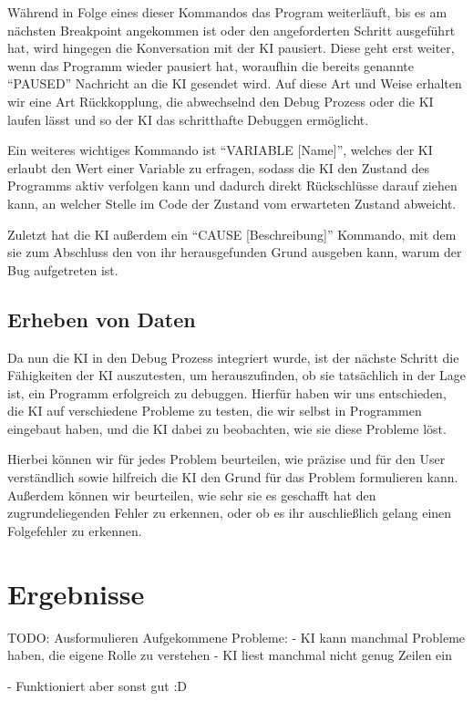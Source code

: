 \documentclass[a4paper,12pt,ngerman]{scrartcl}
\begin{document}
Während in Folge eines dieser Kommandos das Program weiterläuft, bis es am nächsten Breakpoint angekommen ist oder den angeforderten Schritt ausgeführt hat, wird hingegen die Konversation mit der KI pausiert. Diese geht erst weiter, wenn das Programm wieder pausiert hat, woraufhin die bereits genannte ``PAUSED'' Nachricht an die KI gesendet wird. Auf diese Art und Weise erhalten wir eine Art Rückkopplung, die abwechselnd den Debug Prozess oder die KI laufen lässt und so der KI das schritthafte Debuggen ermöglicht.

Ein weiteres wichtiges Kommando ist ``VARIABLE [Name]'', welches der KI erlaubt den Wert einer Variable zu erfragen, sodass die KI den Zustand des Programms aktiv verfolgen kann und dadurch direkt Rückschlüsse darauf ziehen kann, an welcher Stelle im Code der Zustand vom erwarteten Zustand abweicht.

Zuletzt hat die KI außerdem ein ``CAUSE [Beschreibung]'' Kommando, mit dem sie zum Abschluss den von ihr herausgefunden Grund ausgeben kann, warum der Bug aufgetreten ist.

\subsection{Erheben von Daten}

Da nun die KI in den Debug Prozess integriert wurde, ist der nächste Schritt die Fähigkeiten der KI auszutesten, um herauszufinden, ob sie tatsächlich in der Lage ist, ein Programm erfolgreich zu debuggen. Hierfür haben wir uns entschieden, die KI auf verschiedene Probleme zu testen, die wir selbst in Programmen eingebaut haben, und die KI dabei zu beobachten, wie sie diese Probleme löst.

Hierbei können wir für jedes Problem beurteilen, wie präzise und für den User verständlich sowie hilfreich die KI den Grund für das Problem formulieren kann. Außerdem können wir beurteilen, wie sehr sie es geschafft hat den zugrundeliegenden Fehler zu erkennen, oder ob es ihr auschließlich gelang einen Folgefehler zu erkennen.

\section{Ergebnisse}

TODO: Ausformulieren
Aufgekommene Probleme:
- KI kann manchmal Probleme haben, die eigene Rolle zu verstehen
- KI liest manchmal nicht genug Zeilen ein

- Funktioniert aber sonst gut :D
\end{document}
